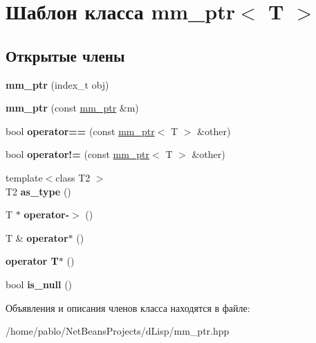 \hypertarget{classmm__ptr}{}\section{Шаблон класса mm\+\_\+ptr$<$ T $>$}
\label{classmm__ptr}
\subsection*{Открытые члены}
\begin{DoxyCompactItemize}
\item 
\mbox{\label{classmm__ptr_aa3b923c8263b7be8549cbe6bc8a5c98c}} 
{\bfseries mm\+\_\+ptr} (index\+\_\+t obj)
\item 
\mbox{\label{classmm__ptr_aa3b08f2a7e216e1592bf32a003e310cd}} 
{\bfseries mm\+\_\+ptr} (const \mbox{\hyperlink{classmm__ptr}{mm\+\_\+ptr}} \&m)
\item 
\mbox{\label{classmm__ptr_aeaa092d03f5ddcf1be1b8f34479b086e}} 
bool {\bfseries operator==} (const \mbox{\hyperlink{classmm__ptr}{mm\+\_\+ptr}}$<$ T $>$ \&other)
\item 
\mbox{\label{classmm__ptr_a7ffa5b886182413a429bfab972a27653}} 
bool {\bfseries operator!=} (const \mbox{\hyperlink{classmm__ptr}{mm\+\_\+ptr}}$<$ T $>$ \&other)
\item 
\mbox{\label{classmm__ptr_ab0954ffa5e2b0989df25061dc2ab1df4}} 
{\footnotesize template$<$class T2 $>$ }\\T2 {\bfseries as\+\_\+type} ()
\item 
\mbox{\label{classmm__ptr_a8507bb1d8946b075bbb34ae4570efc9a}} 
T $\ast$ {\bfseries operator-\/$>$} ()
\item 
\mbox{\label{classmm__ptr_a62fce96ab6c4c1073c97ddaec8dac83f}} 
T \& {\bfseries operator$\ast$} ()
\item 
\mbox{\label{classmm__ptr_a9872d528e7c8a788acd02ccae0c9069c}} 
{\bfseries operator T$\ast$} ()
\item 
\mbox{\label{classmm__ptr_a14de2f1e2d597acfa6e145238da2920d}} 
bool {\bfseries is\+\_\+null} ()
\end{DoxyCompactItemize}


Объявления и описания членов класса находятся в файле\+:\begin{DoxyCompactItemize}
\item 
/home/pablo/\+Net\+Beans\+Projects/d\+Lisp/mm\+\_\+ptr.\+hpp\end{DoxyCompactItemize}
